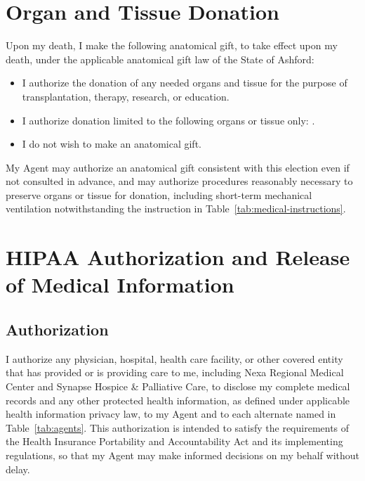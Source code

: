 \section{Organ and Tissue Donation}
\label{sec:donation}

Upon my death, I make the following anatomical gift, to take effect upon my death, under the applicable anatomical gift law of the State of Ashford:

\begin{itemize}[leftmargin=1.6em,itemsep=2pt,topsep=2pt]
\item[$\boxtimes$] I authorize the donation of any needed organs and tissue for the purpose of transplantation, therapy, research, or education.
\item[$\square$] I authorize donation limited to the following organs or tissue only: \underline{\hspace{5cm}}.
\item[$\square$] I do not wish to make an anatomical gift.
\end{itemize}

My Agent may authorize an anatomical gift consistent with this election even if not consulted in advance, and may authorize procedures reasonably necessary to preserve organs or tissue for donation, including short-term mechanical ventilation notwithstanding the instruction in Table~\ref{tab:medical-instructions}.

\section{HIPAA Authorization and Release of Medical Information}
\label{sec:hipaa}

\subsection{Authorization}
I authorize any physician, hospital, health care facility, or other covered entity that has provided or is providing care to me, including Nexa Regional Medical Center and Synapse Hospice \& Palliative Care, to disclose my complete medical records and any other protected health information, as defined under applicable health information privacy law, to my Agent and to each alternate named in Table~\ref{tab:agents}. This authorization is intended to satisfy the requirements of the Health Insurance Portability and Accountability Act and its implementing regulations, so that my Agent may make informed decisions on my behalf without delay.

